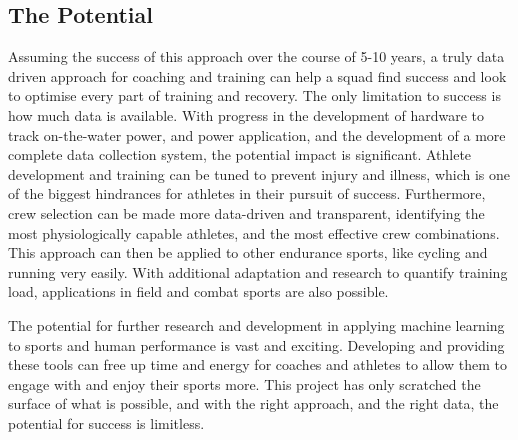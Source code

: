 \subsection{The Potential}
Assuming the success of this approach over the course of 5-10 years, a truly data driven approach for coaching and training can help a squad find success and look to optimise every part of training and recovery. The only limitation to success is how much data is available. With progress in the development of hardware to track on-the-water power, and power application, and the development of a more complete data collection system, the potential impact is significant. Athlete development and training can be tuned to prevent injury and illness, which is one of the biggest hindrances for athletes in their pursuit of success. Furthermore, crew selection can be made more data-driven and transparent, identifying the most physiologically capable athletes, and the most effective crew combinations. This approach can then be applied to other endurance sports, like cycling and running very easily. With additional adaptation and research to quantify training load, applications in field and combat sports are also possible.

The potential for further research and development in applying machine learning to sports and human performance is vast and exciting. Developing and providing these tools can free up time and energy for coaches and athletes to allow them to engage with and enjoy their sports more. This project has only scratched the surface of what is possible, and with the right approach, and the right data, the potential for success is limitless.